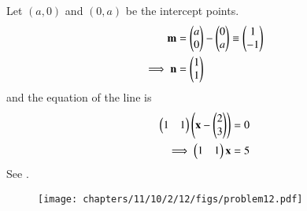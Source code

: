 Let $(a,0)$  and  $(0,a)$ be the intercept points. 
\begin{align}
\mathbf{m} 
        &=   \begin{pmatrix}
		a \\
		0 
		\end{pmatrix} - \begin{pmatrix}
		   0 \\
		   a
		\end{pmatrix}  
        		  \equiv \begin{pmatrix}
                           1 \\
			   -1 
		         \end{pmatrix} 
			 \\
			 \implies
\mathbf{n} &=  \begin{pmatrix}
		     1 \\
		     1
	     \end{pmatrix} 
\end{align}
and 
the equation of the  line is
\begin{align}
	\begin{pmatrix} 1 & 1 \end{pmatrix} \left( \mathbf{ x  - \begin{pmatrix} 2 \\
                                   3
			     \end{pmatrix}
		}\right)  &= 0  \\
\implies		\begin{pmatrix} 1 & 1\end{pmatrix} \mathbf{x}  &= 5 
        \label{eq:11/10/2/12/1}
\end{align}
See  .
\begin{figure}[H]
	\begin{center}
		\texttt{[image: chapters/11/10/2/12/figs/problem12.pdf]}
	\end{center}
\caption{}
\label{fig:11/10/2/12/Fig1}
\end{figure}

